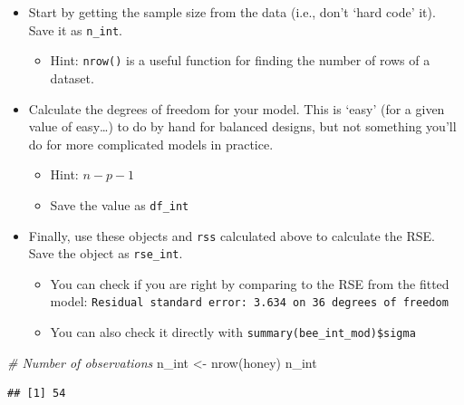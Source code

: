 \documentclass[
  openany]{book}
\newenvironment{Shaded}{\begin{snugshade}}{\end{snugshade}}
\newcommand{\CommentTok}[1]{\textcolor[rgb]{0.56,0.35,0.01}{\textit{#1}}}
\newcommand{\FunctionTok}[1]{\textcolor[rgb]{0.00,0.00,0.00}{#1}}
\newcommand{\NormalTok}[1]{#1}
\newcommand{\OtherTok}[1]{\textcolor[rgb]{0.56,0.35,0.01}{#1}}
\newcommand{\SpecialCharTok}[1]{\textcolor[rgb]{0.00,0.00,0.00}{#1}}
\providecommand{\tightlist}{%
  \setlength{\itemsep}{0pt}\setlength{\parskip}{0pt}}
\begin{document}
\begin{itemize}
\tightlist
\item
  Start by getting the sample size from the data (i.e., don't `hard code' it). Save it as \texttt{n\_int}.

  \begin{itemize}
  \tightlist
  \item
    Hint: \texttt{nrow()} is a useful function for finding the number of rows of a dataset.\\
  \end{itemize}
\item
  Calculate the degrees of freedom for your model. This is `easy' (for a given value of easy\ldots) to do by hand for balanced designs, but not something you'll do for more complicated models in practice.

  \begin{itemize}
  \tightlist
  \item
    Hint: \(n-p-1\)
  \item
    Save the value as \texttt{df\_int}
  \end{itemize}
\item
  Finally, use these objects and \texttt{rss} calculated above to calculate the RSE. Save the object as \texttt{rse\_int}.

  \begin{itemize}
  \tightlist
  \item
    You can check if you are right by comparing to the RSE from the fitted model: \texttt{Residual\ standard\ error:\ 3.634\ on\ 36\ degrees\ of\ freedom}\\
  \item
    You can also check it directly with \texttt{summary(bee\_int\_mod)\$sigma}
  \end{itemize}
\end{itemize}

\begin{Shaded}
\begin{Highlighting}[]
\CommentTok{\# Number of observations}
\NormalTok{n\_int }\OtherTok{\textless{}{-}} \FunctionTok{nrow}\NormalTok{(honey)}
\NormalTok{n\_int}
\end{Highlighting}
\end{Shaded}

\begin{verbatim}
## [1] 54
\end{verbatim}

\begin{Shaded}
\end{Shaded}
\end{document}
